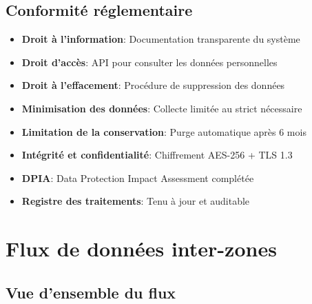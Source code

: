 \documentclass[11pt,a4paper]{article}
\begin{document}
\subsection{Conformité réglementaire}

\begin{tcolorbox}[colback=blue!5, colframe=blue!50!black, title=\textbf{Conformité RGPD - Checklist}]
\begin{itemize}[leftmargin=*]
    \item[$\square$] \textbf{Droit à l'information}: Documentation transparente du système
    \item[$\square$] \textbf{Droit d'accès}: API pour consulter les données personnelles
    \item[$\square$] \textbf{Droit à l'effacement}: Procédure de suppression des données
    \item[$\square$] \textbf{Minimisation des données}: Collecte limitée au strict nécessaire
    \item[$\square$] \textbf{Limitation de la conservation}: Purge automatique après 6 mois
    \item[$\square$] \textbf{Intégrité et confidentialité}: Chiffrement AES-256 + TLS 1.3
    \item[$\square$] \textbf{DPIA}: Data Protection Impact Assessment complétée
    \item[$\square$] \textbf{Registre des traitements}: Tenu à jour et auditable
\end{itemize}
\end{tcolorbox}

\newpage

\section{Flux de données inter-zones}

\subsection{Vue d'ensemble du flux}
\end{document}
